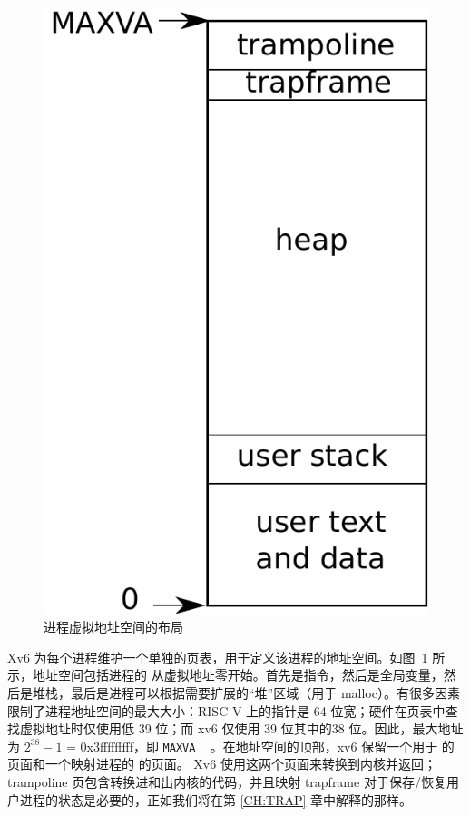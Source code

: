    \begin{figure}[t]
\centering
\includegraphics[scale=0.5]{fig/as.pdf}
\caption{进程虚拟地址空间的布局  }
\label{fig:as}
\end{figure}     

Xv6 为每个进程维护一个单独的页表，用于定义该进程的地址空间。如图~\ref{fig:as}   所示，地址空间包括进程的
        从虚拟地址零开始。首先是指令，然后是全局变量，然后是堆栈，最后是进程可以根据需要扩展的“堆”区域（用于 malloc）。有很多因素限制了进程地址空间的最大大小：RISC-V 上的指针是 64 位宽；硬件在页表中查找虚拟地址时仅使用低 39 位；而 xv6 仅使用 39 位其中的38 位。因此，最大地址为    $2^{38}-1$    = 0x3fffffffff，即    \lstinline{MAXVA}    ~    。在地址空间的顶部，xv6 保留一个用于        的页面和一个映射进程的        的页面。 Xv6 使用这两个页面来转换到内核并返回；trampoline 页包含转换进和出内核的代码，并且映射 trapframe 对于保存/恢复用户进程的状态是必要的，正如我们将在第    \ref{CH:TRAP}    章中解释的那样。  

